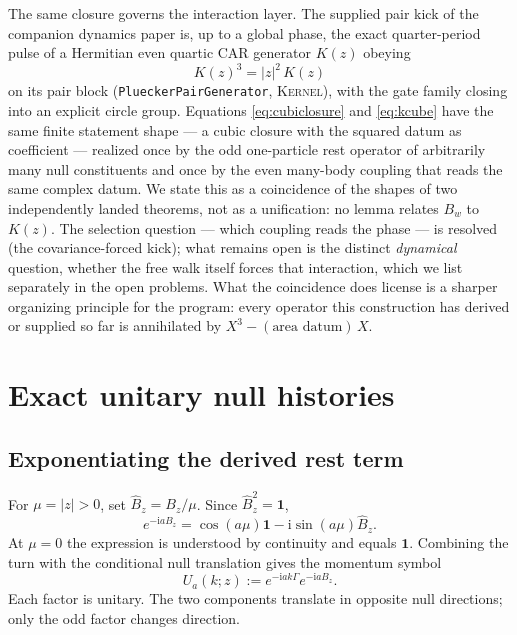 \documentclass[11pt]{article}
\newcommand{\Kernel}{\textcolor{kernelcolor}{\textsc{Kernel}}}
\newcommand{\ii}{\mathrm{i}}
\newcommand{\id}{\mathbf{1}}
\begin{document}
The same closure governs the interaction layer.  The supplied pair kick
of the companion dynamics paper is, up to a global phase, the exact
quarter-period pulse of a Hermitian even quartic CAR generator $K(z)$
obeying
\begin{equation}\label{eq:kcube}
  K(z)^3=|z|^2\,K(z)
\end{equation}
on its pair block (\texttt{PlueckerPairGenerator}, \Kernel{}), with the
gate family closing into an explicit circle group.  Equations
\eqref{eq:cubiclosure} and \eqref{eq:kcube} have the same finite
statement shape --- a cubic closure with the squared datum as
coefficient ---
realized once by the odd one-particle rest operator of arbitrarily many
null constituents and once by the even many-body coupling that reads the
same complex datum.  We state this as a coincidence of the shapes of two
independently landed theorems, not as a unification: no lemma relates
$B_w$ to $K(z)$.  The selection question --- which
coupling reads the phase --- is resolved (the covariance-forced kick);
what remains open is the distinct \emph{dynamical} question, whether the
free walk itself forces that interaction, which we list separately in
the open problems.  What the
coincidence does license is a sharper organizing principle for the
program: every operator this construction has derived or supplied so far
is annihilated by $X^3-(\text{area datum})\,X$.

\section{Exact unitary null histories}

\subsection{Exponentiating the derived rest term}

For $\mu=|z|>0$, set $\widehat B_z=B_z/\mu$.  Since
$\widehat B_z^2=\id$,
\begin{equation}\label{eq:expB}
 e^{-\ii aB_z}
 =\cos(a\mu)\id-\ii\sin(a\mu)\widehat B_z.
\end{equation}
At $\mu=0$ the expression is understood by continuity and equals $\id$.
Combining the turn with the conditional null translation gives the momentum
symbol
\begin{equation}\label{eq:walk}
 U_a(k;z):=e^{-\ii ak\Gamma}e^{-\ii aB_z}.
\end{equation}
Each factor is unitary.  The two components translate in opposite null
directions; only the odd factor changes direction.
\end{document}
